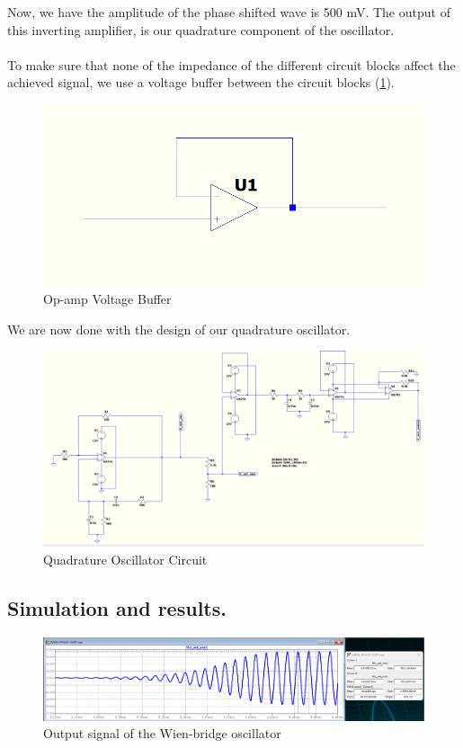 Now, we have the amplitude of the phase shifted wave is 500 mV. The output of this inverting amplifier, is our quadrature component of the oscillator.\\
\\
To make sure that none of the impedance of the different circuit blocks affect the achieved signal, we use a voltage buffer between the circuit blocks (\cref{fig:op-amp-buffer}).
\begin{figure}[H]
    \centering
    \includegraphics[width=1\linewidth]{voltage-buffer.png}
    \caption{Op-amp Voltage Buffer}
    \label{fig:op-amp-buffer}
\end{figure}
We are now done with the design of our quadrature oscillator.

\begin{figure}[H]
    \centering
    \includegraphics[width=1\linewidth]{quad-osc-ckt.png}
    \caption{Quadrature Oscillator Circuit}
    \label{fig:enter-label}
\end{figure}

\subsection{Simulation and results.}
\begin{figure}[H]
    \centering
    \includegraphics[width=1\linewidth]{wien-osc-output.png}
    \caption{Output signal of the Wien-bridge oscillator}
    \label{fig: wien-output}
\end{figure}


